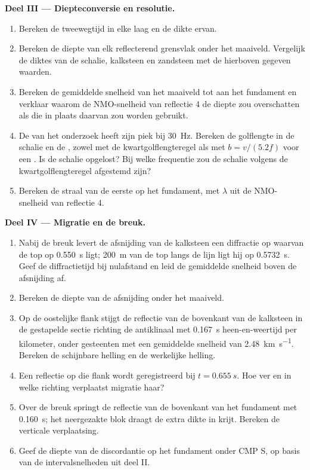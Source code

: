\begin{problem}
\noindent\textbf{Deel III --- Diepteconversie en resolutie.}
\begin{enumerate}[resume]
  \item Bereken de tweewegtijd in elke laag en de dikte ervan.
  \item Bereken de diepte van elk reflecterend grensvlak onder het maaiveld. Vergelijk
        de diktes van de schalie, kalksteen en zandsteen met de
        hierboven gegeven waarden.
  \item Bereken de gemiddelde snelheid van het maaiveld tot aan het fundament en verklaar
        waarom de NMO-snelheid van reflectie 4 de diepte zou overschatten als die in plaats daarvan
        zou worden gebruikt.
  \item De  van het onderzoek heeft zijn piek bij \qty{30}{Hz}. Bereken de golflengte in
        de schalie en de , zowel met de kwartgolflengteregel als met $b = v/(5.2f)$
        voor een . Is de schalie opgelost? Bij welke frequentie zou de schalie
        volgens de kwartgolflengteregel afgestemd zijn?
  \item Bereken de straal van de eerste  op het fundament, met $\lambda$
        uit de NMO-snelheid van reflectie 4.
\end{enumerate}

\noindent\textbf{Deel IV --- Migratie en de breuk.}
\begin{enumerate}[resume]
  \item Nabij de breuk levert de afsnijding van de kalksteen een diffractie op waarvan de top
        op \qty{0.550}{s} ligt; \qty{200}{m} van de top langs de lijn ligt hij op
        \qty{0.5732}{s}. Geef de diffractietijd bij nulafstand en leid de
        gemiddelde snelheid boven de afsnijding af.
  \item Bereken de diepte van de afsnijding onder het maaiveld.
  \item Op de oostelijke flank stijgt de reflectie van de bovenkant van de kalksteen in de gestapelde
        sectie richting de antiklinaal met \qty{0.167}{s} heen-en-weertijd per
        kilometer, onder gesteenten met een gemiddelde snelheid van \qty{2.48}{km.s^{-1}}.
        Bereken de schijnbare helling en de werkelijke helling.
  \item Een reflectie op die flank wordt geregistreerd bij $t = \qty{0.655}{s}$. Hoe ver en in welke
        richting verplaatst migratie haar?
  \item Over de breuk springt de reflectie van de bovenkant van het fundament met \qty{0.160}{s};
        het neergezakte blok draagt de extra dikte in krijt. Bereken de
        verticale verplaatsing.
  \item Geef de diepte van de discordantie op het fundament onder CMP S, op basis van de
        intervalsnelheden uit deel II.
\end{enumerate}
\end{problem}
